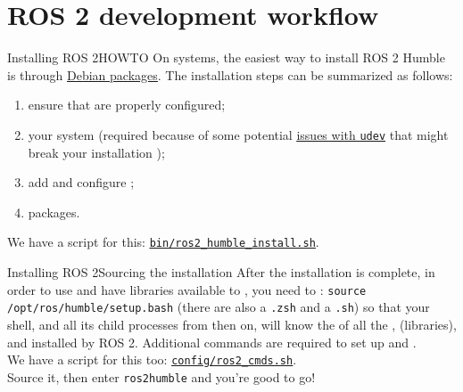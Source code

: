 
\section{ROS 2 development workflow}
\graphicspath{{figs/section1/}}

\begin{frame}{Installing ROS 2}{HOWTO}
  On  systems, the easiest way to install ROS 2 Humble is through \href{https://docs.ros.org/en/humble/Installation/Ubuntu-Install-Debians.html}{\color{blue}\underline{Debian packages}}.
  \newline\newline
  The installation steps can be summarized as follows:
  \begin{enumerate}
    \item ensure that  are properly configured;
    \item {} your system (required because of some potential \href{https://github.com/ros2/ros2/issues/1272}{\color{blue}\underline{issues with \texttt{udev}}} that might break your installation \smiley);
    \item add and configure ;
    \item {} packages.
  \end{enumerate}
  We have a script for this: \href{https://github.com/IntelligentSystemsLabUTV/ros2-examples/blob/humble/bin/ros2_humble_install.sh}{\color{blue}\underline{\texttt{bin/ros2\_humble\_install.sh}}}.
\end{frame}
\begin{frame}{Installing ROS 2}{Sourcing the installation}
  After the installation is complete, in order to use  and have libraries available to , you need to :
  \newline\newline
  \texttt{source /opt/ros/humble/setup.bash} (there are also a \texttt{.zsh} and a \texttt{.sh})
  \newline\newline
  so that your shell, and all its child processes from then on, will know the  of all the ,  (libraries), and  installed by ROS 2.
  \newline\newline
  Additional commands are required to set up  and .\\
  We have a script for this too: \href{https://github.com/IntelligentSystemsLabUTV/ros2-examples/blob/humble/config/ros2_cmds.sh}{\color{blue}\underline{\texttt{config/ros2\_cmds.sh}}}.\\
  Source it, then enter \texttt{ros2humble} and you're good to go!
\end{frame}

